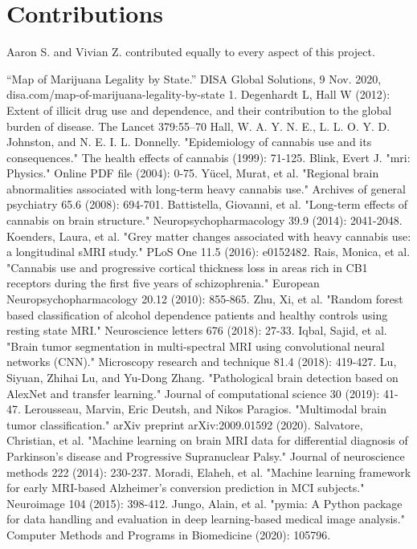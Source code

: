 \documentclass[conference]{IEEEtran}
\begin{document}
\section*{Contributions}

Aaron S. and Vivian Z. contributed equally to every aspect of this project.




\begin{thebibliography}{00}

 “Map of Marijuana Legality by State.” DISA Global Solutions, 9 Nov. 2020, disa.com/map-of-marijuana-legality-by-state
 1. Degenhardt L, Hall W (2012): Extent of illicit drug use and dependence, and their contribution to the global burden of disease. The Lancet 379:55–70
 Hall, W. A. Y. N. E., L. L. O. Y. D. Johnston, and N. E. I. L. Donnelly. "Epidemiology of cannabis use and its consequences." The health effects of cannabis (1999): 71-125.
 Blink, Evert J. "mri: Physics." Online PDF file (2004): 0-75.
 Yücel, Murat, et al. "Regional brain abnormalities associated with long-term heavy cannabis use." Archives of general psychiatry 65.6 (2008): 694-701.
 Battistella, Giovanni, et al. "Long-term effects of cannabis on brain structure." Neuropsychopharmacology 39.9 (2014): 2041-2048.
 Koenders, Laura, et al. "Grey matter changes associated with heavy cannabis use: a longitudinal sMRI study." PLoS One 11.5 (2016): e0152482.
 Rais, Monica, et al. "Cannabis use and progressive cortical thickness loss in areas rich in CB1 receptors during the first five years of schizophrenia." European Neuropsychopharmacology 20.12 (2010): 855-865.
 Zhu, Xi, et al. "Random forest based classification of alcohol dependence patients and healthy controls using resting state MRI." Neuroscience letters 676 (2018): 27-33.
 Iqbal, Sajid, et al. "Brain tumor segmentation in multi‐spectral MRI using convolutional neural networks (CNN)." Microscopy research and technique 81.4 (2018): 419-427.
 Lu, Siyuan, Zhihai Lu, and Yu-Dong Zhang. "Pathological brain detection based on AlexNet and transfer learning." Journal of computational science 30 (2019): 41-47.
 Lerousseau, Marvin, Eric Deutsh, and Nikos Paragios. "Multimodal brain tumor classification." arXiv preprint arXiv:2009.01592 (2020).
 Salvatore, Christian, et al. "Machine learning on brain MRI data for differential diagnosis of Parkinson's disease and Progressive Supranuclear Palsy." Journal of neuroscience methods 222 (2014): 230-237.
 Moradi, Elaheh, et al. "Machine learning framework for early MRI-based Alzheimer's conversion prediction in MCI subjects." Neuroimage 104 (2015): 398-412.
 Jungo, Alain, et al. "pymia: A Python package for data handling and evaluation in deep learning-based medical image analysis." Computer Methods and Programs in Biomedicine (2020): 105796.


\end{thebibliography}
\end{document}
